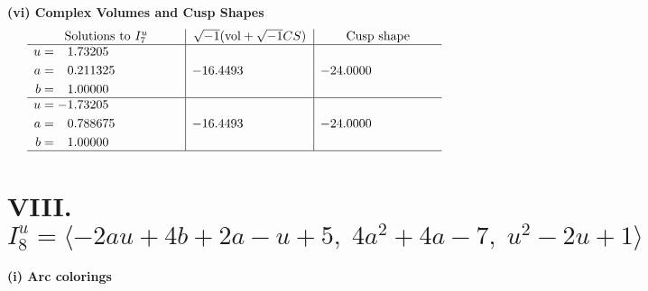 \documentclass[1p]{elsarticle_modified}
\theoremstyle{definition}
\newcommand{\I}{\sqrt{-1}}
\begin{document}
\newpage\flushleft \textbf{(vi) Complex Volumes and Cusp Shapes}
$$\begin{array}{c|c|c}  
\text{Solutions to }I^u_{7}& \I (\text{vol} + \sqrt{-1}CS) & \text{Cusp shape}\\
 \hline 
\begin{aligned}
u &= \phantom{-}1.73205\phantom{ +0.000000I} \\
a &= \phantom{-}0.211325\phantom{ +0.000000I} \\
b &= \phantom{-}1.00000\phantom{ +0.000000I}\end{aligned}
 & -16.4493\phantom{ +0.000000I} & -24.0000\phantom{ +0.000000I} \\ \hline\begin{aligned}
u &= -1.73205\phantom{ +0.000000I} \\
a &= \phantom{-}0.788675\phantom{ +0.000000I} \\
b &= \phantom{-}1.00000\phantom{ +0.000000I}\end{aligned}
 & -16.4493\phantom{ +0.000000I} & -24.0000\phantom{ +0.000000I}\\
 \hline 
 \end{array}$$\newpage\newpage\renewcommand{\arraystretch}{1}
\centering \section*{VIII. $I^u_{8}= \langle -2 a u+4 b+2 a- u+5,\;4 a^2+4 a-7,\;u^2-2 u+1 \rangle$}
\flushleft \textbf{(i) Arc colorings}\\
\end{document}
